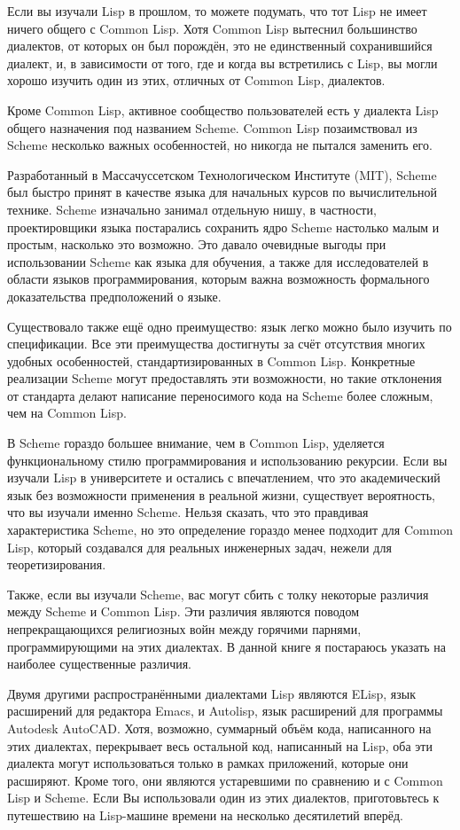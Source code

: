 Если вы изучали Lisp в прошлом, то можете подумать, что тот Lisp не имеет ничего общего с
Common Lisp. Хотя Common Lisp вытеснил большинство диалектов, от которых он был порождён,
это не единственный сохранившийся диалект, и, в зависимости от того, где и когда вы
встретились с Lisp, вы могли хорошо изучить один из этих, отличных от Common Lisp,
диалектов.

Кроме Common Lisp, активное сообщество пользователей есть у диалекта Lisp общего
назначения под названием Scheme. Common Lisp позаимствовал из Scheme несколько важных
особенностей, но никогда не пытался заменить его.

Разработанный в Массачуссетском Технологическом Институте (MIT), Scheme был быстро принят
в качестве языка для начальных курсов по вычислительной технике. Scheme изначально занимал
отдельную нишу, в частности, проектировщики языка постарались сохранить ядро Scheme
настолько малым и простым, насколько это возможно. Это давало очевидные выгоды при
использовании Scheme как языка для обучения, а также для исследователей в области языков
программирования, которым важна возможность формального доказательства предположений о
языке.

Существовало также ещё одно преимущество: язык легко можно было изучить по
спецификации. Все эти преимущества достигнуты за счёт отсутствия многих удобных
особенностей, стандартизированных в Common Lisp. Конкретные реализации Scheme могут
предоставлять эти возможности, но такие отклонения от стандарта делают написание
переносимого кода на Scheme более сложным, чем на Common Lisp.

В Scheme гораздо большее внимание, чем в Common Lisp, уделяется функциональному стилю
программирования и использованию рекурсии. Если вы изучали Lisp в университете и остались
с впечатлением, что это академический язык без возможности применения в реальной жизни,
существует вероятность, что вы изучали именно Scheme. Нельзя сказать, что это правдивая
характеристика Scheme, но это определение гораздо менее подходит для Common Lisp, который
создавался для реальных инженерных задач, нежели для теоретизирования.

Также, если вы изучали Scheme, вас могут сбить с толку некоторые различия между Scheme и
Common Lisp. Эти различия являются поводом непрекращающихся религиозных войн между
горячими парнями, программирующими на этих диалектах. В данной книге я постараюсь указать
на наиболее существенные различия.

Двумя другими распространёнными диалектами Lisp являются ELisp, язык расширений для
редактора Emacs, и Autolisp, язык расширений для программы Autodesk AutoCAD. Хотя,
возможно, суммарный объём кода, написанного на этих диалектах, перекрывает весь остальной
код, написанный на Lisp, оба эти диалекта могут использоваться только в рамках приложений,
которые они расширяют. Кроме того, они являются устаревшими по сравнению и с Common Lisp и
Scheme. Если Вы использовали один из этих диалектов, приготовьтесь к путешествию на
Lisp-машине времени на несколько десятилетий вперёд.

